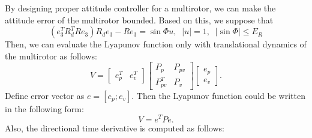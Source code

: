 \documentclass{article}
\begin{document}
\newpage
By designing proper attitude controller for a multirotor, we can make the attitude error of the multirotor bounded.
Based on this, we suppose that 
\begin{equation}
(e_3^TR_d^TRe_3)R_de_3 - Re_3 = \sin\Phi u,\;\;|u| = 1,\;\;|\sin\Phi| \leq E_R \nonumber
\end{equation}
Then, we can evaluate the Lyapunov function only with translational dynamics of the multirotor as follows:
\begin{equation}
    V = \left[
        \begin{array}{cc}
        e_p^T & e_v^T
        \end{array}
        \right] 
        \left[
        \begin{array}{cc}
		P_p & P_{pv} \\ P_{pv}^T & P_v
        \end{array}
        \right]
		\left[
		\begin{array}{c}
		e_p \\ e_v
		\end{array}
		\right]. \nonumber
\end{equation}
Define error vector as $e = [e_p;e_v]$. Then the Lyapunov function could be written in the following form:
\begin{equation}
V=e^TPe. \nonumber
\end{equation}
Also, the directional time derivative is computed as follows:
\end{document}

